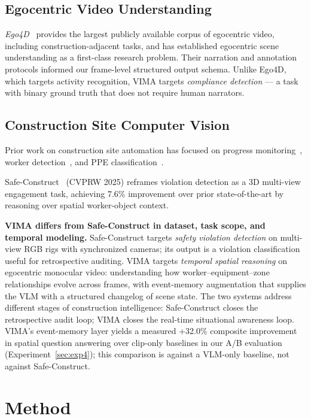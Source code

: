 \documentclass[sigconf,nonacm]{acmart}
\begin{document}
\subsection{Egocentric Video Understanding}

\emph{Ego4D}~\cite{ego4d2022} provides the largest publicly available corpus
of egocentric video, including construction-adjacent tasks, and has
established egocentric scene understanding as a first-class research
problem.
Their narration and annotation protocols informed our frame-level
structured output schema.
Unlike Ego4D, which targets activity recognition, VIMA targets
\emph{compliance detection} --- a task with binary ground truth that
does not require human narrators.

\subsection{Construction Site Computer Vision}

Prior work on construction site automation has focused on progress
monitoring~\cite{golparvar2011monitoring}, worker
detection~\cite{yang2018worker}, and PPE
classification~\cite{nath2020ppe}.

Safe-Construct~\cite{chharia2025safeconstruct} (CVPRW 2025) reframes
violation detection as a 3D multi-view engagement task, achieving 7.6\%
improvement over prior state-of-the-art by reasoning over spatial
worker-object context.

\textbf{VIMA differs from Safe-Construct in dataset, task scope, and
temporal modeling.}
Safe-Construct targets \emph{safety violation detection} on multi-view
RGB rigs with synchronized cameras; its output is a violation
classification useful for retrospective auditing.
VIMA targets \emph{temporal spatial reasoning} on egocentric monocular
video: understanding how worker--equipment--zone relationships evolve
across frames, with event-memory augmentation that supplies the VLM with
a structured changelog of scene state.
The two systems address different stages of construction intelligence:
Safe-Construct closes the retrospective audit loop; VIMA closes the
real-time situational awareness loop.
VIMA's event-memory layer yields a measured +32.0\% composite
improvement in spatial question answering over clip-only baselines in our
A/B evaluation (Experiment~\ref{sec:exp4}); this comparison is against a
VLM-only baseline, not against Safe-Construct.

\section{Method}
\label{sec:method}
\end{document}
